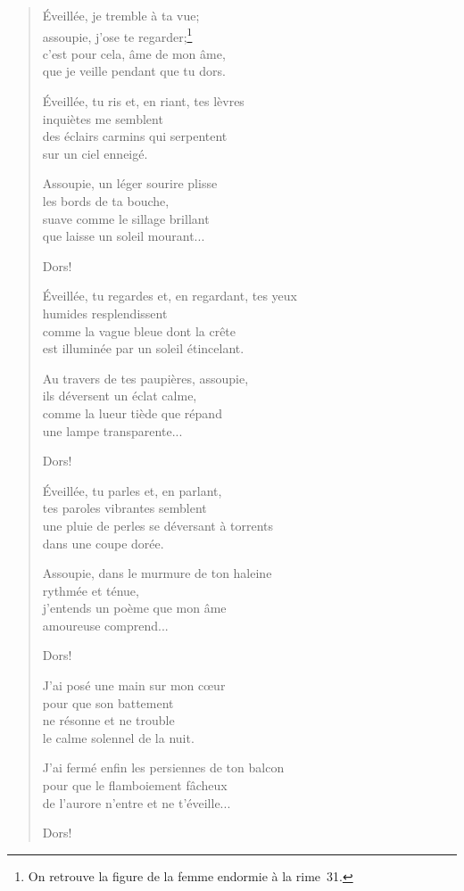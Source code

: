 \begin{verse}
  Éveillée, je tremble à ta vue; \\
  assoupie, j'ose te regarder;\footnote{On retrouve la figure de la femme endormie à la rime~31.} \\
  c'est pour cela, âme de mon âme, \\
  que je veille pendant que tu dors.

  Éveillée, tu ris et, en riant, tes lèvres \\
  inquiètes me semblent \\
  des éclairs carmins qui serpentent \\
  sur un ciel enneigé.

  Assoupie, un léger sourire plisse \\
  les bords de ta bouche, \\
  suave comme le sillage brillant \\
  que laisse un soleil mourant...

  Dors!

  Éveillée, tu regardes et, en regardant, tes yeux \\
  humides resplendissent \\
  comme la vague bleue dont la crête \\
  est illuminée par un soleil étincelant.

  Au travers de tes paupières, assoupie, \\
  ils déversent un éclat calme, \\
  comme la lueur tiède que répand \\
  une lampe transparente...

  Dors!

  Éveillée, tu parles et, en parlant, \\
  tes paroles vibrantes semblent \\
  une pluie de perles se déversant à torrents \\
  dans une coupe dorée.

  Assoupie, dans le murmure de ton haleine \\
  rythmée et ténue, \\
  j'entends un poème que mon âme \\
  amoureuse comprend...

  Dors!

  J'ai posé une main sur mon cœur \\
  pour que son battement \\
  ne résonne et ne trouble \\
  le calme solennel de la nuit.

  J'ai fermé enfin les persiennes
  de ton balcon \\
  pour que le flamboiement fâcheux \\
  de l'aurore n'entre et ne t'éveille...

  Dors!
\end{verse}

